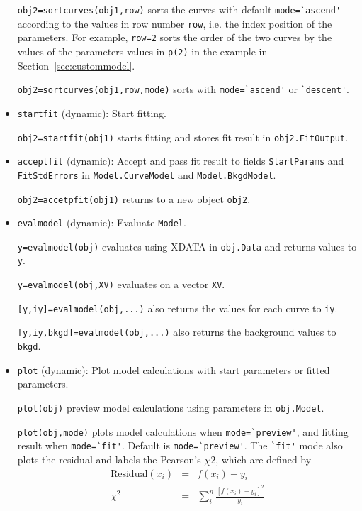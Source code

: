 \documentclass[reprint,showpacs,prb,nofootinbib,amsmath,amssymb]{revtex4-1}
\begin{document}
\begin{itemize}
\verb|obj2=sortcurves(obj1,row)| sorts the curves with default \verb|mode=`ascend'| according to the values in row number \verb|row|, i.e. the index position of the parameters. For example, \verb|row=2| sorts the order of the two curves by the values of the parameters values in \verb|p(2)| in the example in Section~\ref{sec:custommodel}.

\verb|obj2=sortcurves(obj1,row,mode)| sorts with \verb|mode=`ascend'| or \verb|`descent'|.

\item \verb|startfit| (dynamic): Start fitting.

\verb|obj2=startfit(obj1)| starts fitting and stores fit result in \verb|obj2.FitOutput|.

\item \verb|acceptfit| (dynamic): Accept and pass fit result to fields \verb|StartParams| and \verb|FitStdErrors| in \verb|Model.CurveModel| and \verb|Model.BkgdModel|.

\verb|obj2=accetpfit(obj1)| returns to a new object \verb|obj2|.

\item \verb|evalmodel| (dynamic): Evaluate \verb|Model|.

\verb|y=evalmodel(obj)| evaluates using XDATA in \verb|obj.Data| and returns values to \verb|y|.

\verb|y=evalmodel(obj,XV)| evaluates on a vector \verb|XV|.

\verb|[y,iy]=evalmodel(obj,...)| also returns the values for each curve to \verb|iy|.

\verb|[y,iy,bkgd]=evalmodel(obj,...)| also returns the background values to \verb|bkgd|.

\item \verb|plot| (dynamic): Plot model calculations with start parameters or fitted parameters.

\verb|plot(obj)| preview model calculations using parameters in \verb|obj.Model|.

\verb|plot(obj,mode)| plots model calculations when \verb|mode=`preview'|, and fitting result when \verb|mode=`fit'|. Default is \verb|mode=`preview'|. The \verb|`fit'| mode also plots the residual and labels the Pearson's $\chi2$, which are defined by 
\begin{eqnarray*}
\mathrm{Residual}(x_i)&=&f(x_i)-y_i \\
\chi^2&=&\sum_{i}^{n}\frac{\left[f(x_i)-y_i\right]^2}{y_i}
\end{eqnarray*}


\end{itemize}
\end{document}
